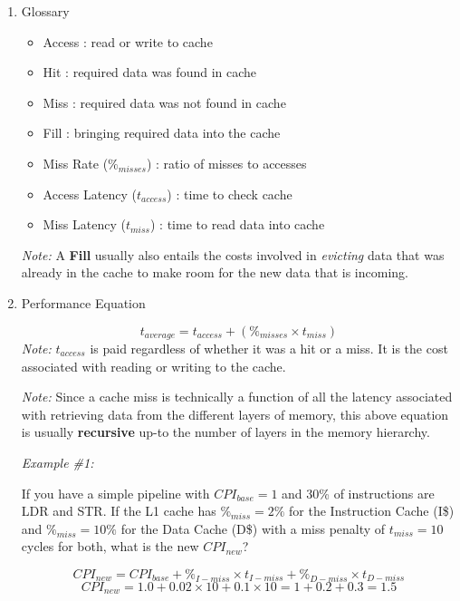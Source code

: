 \documentclass[12pt]{article}
\newenvironment{QandA}{\begin{enumerate}[label=\bfseries\arabic*.]\bfseries}
                      {\end{enumerate}}
\newenvironment{answered}{\par\quad\normalfont}{}
\begin{document}
\begin{QandA}
\item Glossary
\begin{answered}
\vspace{-0.85cm}
\begin{itemize}
    \item Access : read or write to cache
    \item Hit : required data was found in cache
    \item Miss : required data was not found in cache
    \item Fill : bringing required data into the cache
    \item Miss Rate ($\%_{misses}$) : ratio of misses to accesses
    \item Access Latency ($t_{access}$) : time to check cache
    \item Miss Latency ($t_{miss}$) : time to read data into cache
\end{itemize}
\textit{Note:} A \textbf{Fill} usually also entails the costs involved in \textit{evicting} data that was already in the cache to make room for the new data that is incoming. 
\end{answered}

\item Performance Equation
\begin{answered}
\vspace{-0.45cm}
\begin{equation}
    t_{average} = t_{access} + (\%_{misses} \times t_{miss})
\end{equation}
\textit{Note:} $t_{access}$ is paid regardless of whether it was a hit or a miss. It is the cost associated with reading or writing to the cache.

\textit{Note:} Since a cache miss is technically a function of all the latency associated with retrieving data from the different layers of memory, this above equation is usually \textbf{recursive} up-to the number of layers in the memory hierarchy.

\textit{Example \#1:} 

If you have a simple pipeline with $CPI_{base}=1$ and 30\% of instructions are LDR and STR. If the L1 cache has $\%_{miss}=2\%$ for the Instruction Cache (I\$) and $\%_{miss}=10\%$ for the Data Cache (D\$) with a miss penalty of $t_{miss}=10$ cycles for both, what is the new $CPI_{new}$?

\begin{equation*}
    CPI_{new} = CPI_{base} + \%_{I-miss} \times t_{I-miss} + \%_{D-miss} \times t_{D-miss}
\end{equation*}
\begin{equation*}
    CPI_{new} = 1.0 + 0.02 \times 10 + 0.1 \times 10 = 1 + 0.2 + 0.3 = 1.5
\end{equation*}
\end{answered}



\end{QandA}
\end{document}
